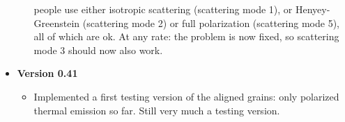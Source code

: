 \documentclass{report}
\begin{document}
\begin{itemize}
\begin{itemize}
    people use either isotropic scattering (scattering mode 1), or
    Henyey-Greenstein (scattering mode 2) or full polarization (scattering
    mode 5), all of which are ok. At any rate: the problem is now fixed,
    so scattering mode 3 should now also work.
  \end{itemize}
\item {\bf Version 0.41}\\
  \begin{itemize}
    \item Implemented a first testing version of the aligned grains:
      only polarized thermal emission so far. Still very much a testing
      version.
  \end{itemize}
\end{itemize}
\end{document}
